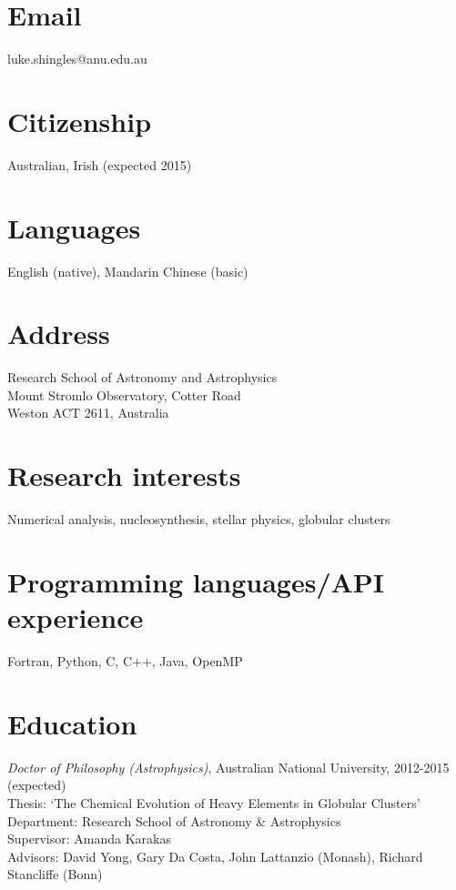 \documentclass[11pt]{res} %
\begin{document}
 
 

\begin{resume}

\section{Email} 
	luke.shingles@anu.edu.au


\section{Citizenship} 
	Australian, Irish (expected 2015)

\section{Languages} 
	English (native), Mandarin Chinese (basic)

\section{Address} 
	Research School of Astronomy and Astrophysics\\
	Mount Stromlo Observatory, Cotter Road \\ 
	Weston ACT 2611, Australia
 	
\section{Research interests}
	 Numerical analysis, nucleosynthesis, stellar physics, globular clusters

\section{Programming languages/API experience}
	Fortran, Python, C, C++, Java, OpenMP

\section{Education} 
	{\it Doctor of Philosophy (Astrophysics)}, Australian National University, 2012-2015 (expected)\\
	Thesis: `The Chemical Evolution of Heavy Elements in Globular Clusters'\\
	Department: Research School of Astronomy \& Astrophysics\\
	Supervisor: Amanda Karakas\\
	Advisors: David Yong, Gary Da Costa, John Lattanzio (Monash), Richard Stancliffe (Bonn)


\end{resume}
\end{document}
